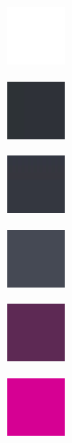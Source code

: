 \begin{figure}[h]\label{gui-colors}
	\centering
	\begin{subfigure}{0.1075\textwidth}
		\centering
		\includegraphics[scale=1, frame]{gui-imgs/R255G255B255A255}
	\end{subfigure}
	\begin{subfigure}{0.1075\textwidth}
		\centering
		\includegraphics[scale=1, frame]{gui-imgs/R46G49B56A255}
	\end{subfigure}
	\begin{subfigure}{0.1075\textwidth}
		\centering
		\includegraphics[scale=1, frame]{gui-imgs/R69G73B84A64}
	\end{subfigure}
	\begin{subfigure}{0.1075\textwidth}
		\centering
		\includegraphics[scale=1, frame]{gui-imgs/R69G73B84A255}
	\end{subfigure}
	\begin{subfigure}{0.1075\textwidth}
		\centering
		\includegraphics[scale=1, frame]{gui-imgs/R214G0B147A64}
	\end{subfigure}
	\begin{subfigure}{0.1075\textwidth}
		\centering
		\includegraphics[scale=1, frame]{gui-imgs/R214G0B147A255}

\end{subfigure}
\end{figure}
